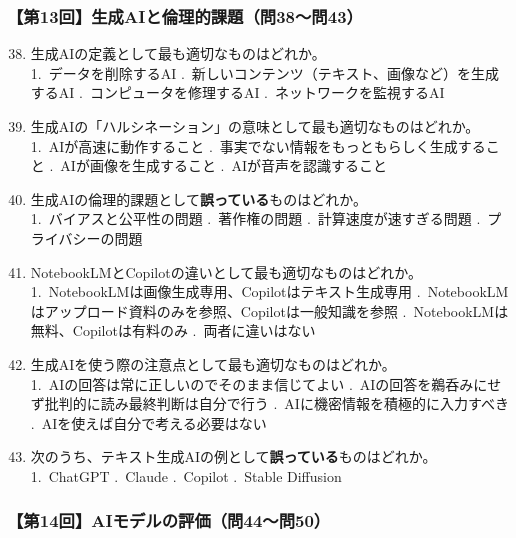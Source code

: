 \documentclass[b4paper,7pt,twocolumn,landscape]{jsarticle}
\begin{document}
\subsubsection*{【第13回】生成AIと倫理的課題（問38〜問43）}

\begin{enumerate}
\setcounter{enumi}{37}
\item 生成AIの定義として最も適切なものはどれか。\\
1.~データを削除するAI .~新しいコンテンツ（テキスト、画像など）を生成するAI .~コンピュータを修理するAI .~ネットワークを監視するAI

\item 生成AIの「ハルシネーション」の意味として最も適切なものはどれか。\\
1.~AIが高速に動作すること .~事実でない情報をもっともらしく生成すること .~AIが画像を生成すること .~AIが音声を認識すること

\item 生成AIの倫理的課題として\textbf{誤っている}ものはどれか。\\
1.~バイアスと公平性の問題 .~著作権の問題 .~計算速度が速すぎる問題 .~プライバシーの問題

\item NotebookLMとCopilotの違いとして最も適切なものはどれか。\\
1.~NotebookLMは画像生成専用、Copilotはテキスト生成専用 .~NotebookLMはアップロード資料のみを参照、Copilotは一般知識を参照 .~NotebookLMは無料、Copilotは有料のみ .~両者に違いはない

\item 生成AIを使う際の注意点として最も適切なものはどれか。\\
1.~AIの回答は常に正しいのでそのまま信じてよい .~AIの回答を鵜呑みにせず批判的に読み最終判断は自分で行う .~AIに機密情報を積極的に入力すべき .~AIを使えば自分で考える必要はない

\item 次のうち、テキスト生成AIの例として\textbf{誤っている}ものはどれか。\\
1.~ChatGPT .~Claude  .~Copilot .~Stable Diffusion
\end{enumerate}

\subsubsection*{【第14回】AIモデルの評価（問44〜問50）}
\end{document}
